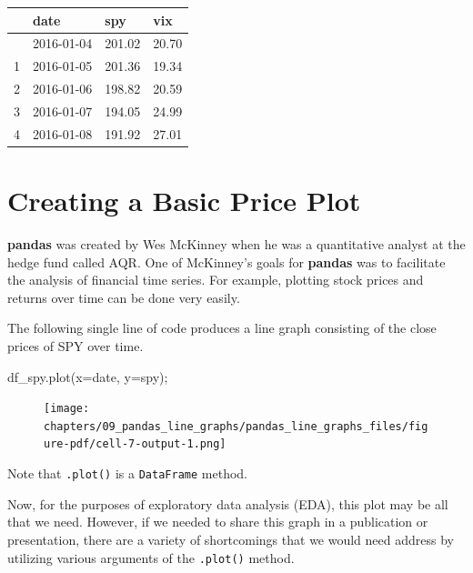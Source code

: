 \documentclass[
  letterpaper,
  DIV=11,
  numbers=noendperiod]{scrreprt}
\newenvironment{Shaded}{\begin{snugshade}}{\end{snugshade}}
\newcommand{\NormalTok}[1]{\textcolor[rgb]{0.00,0.23,0.31}{#1}}
\newcommand{\OperatorTok}[1]{\textcolor[rgb]{0.37,0.37,0.37}{#1}}
\newcommand{\StringTok}[1]{\textcolor[rgb]{0.13,0.47,0.30}{#1}}
\begin{document}
\begin{longtable}[]{@{}llll@{}}
\toprule\noalign{}
& date & spy & vix \\
\midrule\noalign{}
\endhead
\bottomrule\noalign{}
\endlastfoot
0 & 2016-01-04 & 201.02 & 20.70 \\
1 & 2016-01-05 & 201.36 & 19.34 \\
2 & 2016-01-06 & 198.82 & 20.59 \\
3 & 2016-01-07 & 194.05 & 24.99 \\
4 & 2016-01-08 & 191.92 & 27.01 \\
\end{longtable}

\hypertarget{creating-a-basic-price-plot}{%
\section{Creating a Basic Price
Plot}\label{creating-a-basic-price-plot}}

\textbf{pandas} was created by Wes McKinney when he was a quantitative
analyst at the hedge fund called AQR. One of McKinney's goals for
\textbf{pandas} was to facilitate the analysis of financial time series.
For example, plotting stock prices and returns over time can be done
very easily.

The following single line of code produces a line graph consisting of
the close prices of SPY over time.

\begin{Shaded}
\begin{Highlighting}[]
\NormalTok{df\_spy.plot(x}\OperatorTok{=}\StringTok{\textquotesingle{}date\textquotesingle{}}\NormalTok{, y}\OperatorTok{=}\StringTok{\textquotesingle{}spy\textquotesingle{}}\NormalTok{)}\OperatorTok{;}
\end{Highlighting}
\end{Shaded}

\begin{figure}[H]

{\centering \texttt{[image: chapters/09\_pandas\_line\_graphs/pandas\_line\_graphs\_files/figure-pdf/cell-7-output-1.png]}

}

\end{figure}

Note that \texttt{.plot()} is a \texttt{DataFrame} method.

Now, for the purposes of exploratory data analysis (EDA), this plot may
be all that we need. However, if we needed to share this graph in a
publication or presentation, there are a variety of shortcomings that we
would need address by utilizing various arguments of the
\texttt{.plot()} method.
\end{document}
